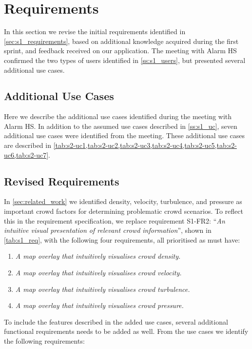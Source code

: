 \section{Requirements} \label{sec:s2_reqs}
In this section we revise the initial requirements identified in \cref{sec:s1_requirements}, based on additional knowledge acquired during the first sprint, and feedback received on our application. The meeting with Alarm HS confirmed the two types of users identified in \cref{ss:s1_users}, but presented several additional use cases.

\subsection{Additional Use Cases} \label{ss:s2_uc}
Here we describe the additional use cases identified during the meeting with Alarm HS. In addition to the assumed use cases described in \cref{ss:s1_uc}, seven additional use cases were identified from the meeting. These additional use cases are described in \cref{tab:s2-uc1,tab:s2-uc2,tab:s2-uc3,tab:s2-uc4,tab:s2-uc5,tab:s2-uc6,tab:s2-uc7}.



\subsection{Revised Requirements} \label{ss:s2_update_reqs}
In \cref{sec:related_work} we identified density, velocity, turbulence, and pressure as important crowd factors for determining problematic crowd scenarios. To reflect this in the requirement specification, we replace requirement S1-FR2: \enquote{\emph{An intuitive visual presentation of relevant crowd information}}, shown in \cref{tab:s1_req}, with the following four requirements, all prioritised as must have:

\begin{enumerate}
    \item \emph{A map overlay that intuitively visualises crowd density.} 
    \item \emph{A map overlay that intuitively visualises crowd velocity.}
    \item \emph{A map overlay that intuitively visualises crowd turbulence.}
    \item \emph{A map overlay that intuitively visualises crowd pressure.}
\end{enumerate}

To include the features described in the added use cases, several additional functional requirements needs to be added as well. From the use cases we identify the following requirements:

